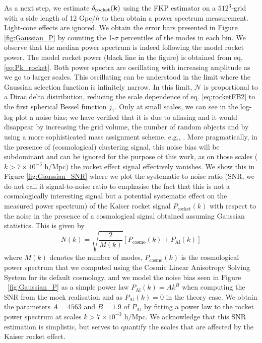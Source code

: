 \documentclass[a4paper,11pt]{article}
\begin{document}
As a next step, we estimate $\delta_{\rm rocket}(\mathbf{k})$ using the FKP estimator on a $512^3$-grid with a side length of 12 Gpc/$h$ to then obtain a power spectrum measurement. Light-cone effects are ignored. 
We obtain the error bars presented in Figure \ref{fig:Gaussian_P} by counting the 1-$\sigma$ percentiles of the modes in each bin. We observe that the median power spectrum is indeed following the model rocket power. The model rocket power (black line in the figure) is obtained from eq. \eqref{eq:Pk_rocket}. Both power spectra are oscillating with increasing amplitude as we go to larger scales. This oscillating can be understood in the limit where the Gaussian selection function is infinitely narrow. In this limit, $\mathcal{N}$ is proportional to a Dirac delta distribution, reducing the scale dependence of eq. \eqref{eq:rocketFB2} to the first spherical Bessel function $j_1$.  Only at small scales, we can see in the log-log plot a noise bias; we have verified that it is due to aliasing and it would disappear by increasing the grid volume, the number of random objects and by using a more sophisticated mass assignment scheme, e.g.,  \cite{Cui:2008fi, Sefusatti:2015aex}. More pragmatically, in the presence of (cosmological) clustering signal, this noise bias will be subdominant and can be ignored for the purpose of this work, as on those scales ($k>7\times 10^{-3}$ h/Mpc) the rocket effect signal effectively vanishes.  We show this in Figure \ref{fig:Gaussian_SNR} where we plot the systematic to noise ratio (SNR, we do not call it signal-to-noise ratio to emphasise the fact that this is not a cosmologically interesting signal but a potential systematic effect on the measured power spectrum) of the Kaiser rocket signal $P_\mathrm{rocket}(k)$ with respect to the noise in the presence of a cosmological signal obtained assuming Gaussian statistics. This is given by  
\begin{equation}
N(k) = \sqrt{\frac{2}{M(k)}}\left[P_\mathrm{cosmo}(k) + P_\mathrm{Al}(k)\right]
\end{equation}
where $M(k)$ denotes the number of modes, $P_\mathrm{cosmo}(k)$ is the cosmological power spectrum that we computed using the Cosmic Linear Anisotropy Solving System  \cite[CLASS]{Blas:2011rf,DiDio_Classgal} for its default cosmology, and we model the noise bias seen in Figure ~\ref{fig:Gaussian_P} as a simple power law $P_\mathrm{Al}(k) = A k^{B}$ 
when computing the SNR from the mock realisation and as $P_\mathrm{Al}(k) = 0$ in the theory case. We obtain the parameters $A = 4563$ and $B = 1.9$ of $P_\mathrm{Al}$ by fitting a power law to the rocket power spectrum at scales $k>7\times 10^{-3}$ h/Mpc. We acknowledge that this SNR estimation is simplistic,  but serves to quantify the scales that are affected by the Kaiser rocket effect. 
\end{document}
